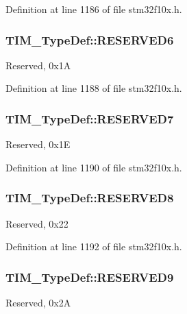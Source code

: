 Definition at line 1186 of file stm32f10x.\-h.

\hypertarget{struct_t_i_m___type_def_a7fd09a4911f813464a454b507832a0b9}{
\subsubsection[{R\-E\-S\-E\-R\-V\-E\-D6}]{ T\-I\-M\-\_\-\-Type\-Def\-::\-R\-E\-S\-E\-R\-V\-E\-D6}}\label{struct_t_i_m___type_def_a7fd09a4911f813464a454b507832a0b9}
Reserved, 0x1\-A 

Definition at line 1188 of file stm32f10x.\-h.

\hypertarget{struct_t_i_m___type_def_a4157fa8f6e188281292f019ea24f5599}{
\subsubsection[{R\-E\-S\-E\-R\-V\-E\-D7}]{ T\-I\-M\-\_\-\-Type\-Def\-::\-R\-E\-S\-E\-R\-V\-E\-D7}}\label{struct_t_i_m___type_def_a4157fa8f6e188281292f019ea24f5599}
Reserved, 0x1\-E 

Definition at line 1190 of file stm32f10x.\-h.

\hypertarget{struct_t_i_m___type_def_ac708e4f0f142ac14d7e1c46778ed6f96}{
\subsubsection[{R\-E\-S\-E\-R\-V\-E\-D8}]{ T\-I\-M\-\_\-\-Type\-Def\-::\-R\-E\-S\-E\-R\-V\-E\-D8}}\label{struct_t_i_m___type_def_ac708e4f0f142ac14d7e1c46778ed6f96}
Reserved, 0x22 

Definition at line 1192 of file stm32f10x.\-h.

\hypertarget{struct_t_i_m___type_def_a6754dd714ff0885e8e511977d2f393ce}{
\subsubsection[{R\-E\-S\-E\-R\-V\-E\-D9}]{ T\-I\-M\-\_\-\-Type\-Def\-::\-R\-E\-S\-E\-R\-V\-E\-D9}}\label{struct_t_i_m___type_def_a6754dd714ff0885e8e511977d2f393ce}
Reserved, 0x2\-A 

